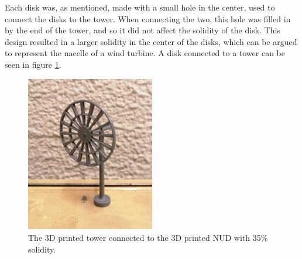Each disk was, as mentioned, made with a small hole in the center, used to connect the disks to the tower. When connecting the two, this hole was filled in by the end of the tower, and so it did not affect the solidity of the disk. This design resulted in a larger solidity in the center of the disks, which can be argued to represent the nacelle of a wind turbine. A disk connected to a tower can be seen in figure \ref{Fig:towerAndAD}. 



\begin{figure}
    \centering
    \includegraphics[width=0.5\textwidth]{0_Images/baseAndAD.jpg}    
    \caption[The tower connected to an actuator disk.]{The 3D printed tower connected to the 3D printed NUD with 35\% solidity.}
    \label{Fig:towerAndAD}
\end{figure}



